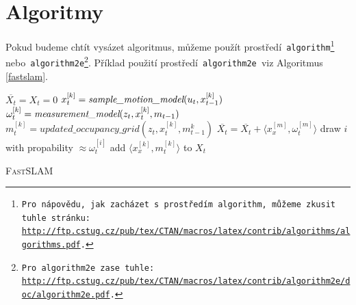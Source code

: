 \documentclass[a4paper, 11pt]{article}
\begin{document}
\section{Algoritmy}\label{algo}
Pokud budeme chtít vysázet algoritmus, můžeme použít prostředí\texttt{ algorithm\footnote{Pro nápovědu, jak zacházet s~prostředím\texttt{ algorithm,} můžeme zkusit tuhle stránku:\\
\href{http://ftp.cstug.cz/pub/tex/CTAN/macros/latex/contrib/algorithms/algorithms.pdf}{http://ftp.cstug.cz/pub/tex/CTAN/macros/latex/contrib/algorithms/algorithms.pdf}.} }nebo\texttt{ algorithm2e\footnote{Pro\texttt{ algorithm2e }zase tuhle: \href{http://ftp.cstug.cz/pub/tex/CTAN/macros/latex/contrib/algorithm2e/doc/algorithm2e.pdf}{http://ftp.cstug.cz/pub/tex/CTAN/macros/latex/contrib/algorithm2e/doc/algorithm2e.pdf}.}}.
Příklad použití prostředí\texttt{ algorithm2e }viz Algoritmus \ref{fastslam}.\\
\IncMargin{1.7em}
\begin{algorithm}[ht]
    \SetAlgoNoLine
    \SetNlSty{}{}{:}
    \DontPrintSemicolon
    \Indm\Indmm
    \BlankLine
    \Indp\Indpp
    $\overline{X_t} = X_t = 0$\;
    {
        \Indpp
        $x_t^{[k]} =  \emph{sample\_motion\_model}(u_t, x_{t-1}^{[k]})$\;
        $\omega_t^{[k]} =  \emph{measurement\_model}(z_t, x_t^{[k]},m_{t-1})$\;
        $m_t^{[k]} = updated\_occupancy\_grid(z_t, x_t^{[k]},m_{t-1}^k)$\;
        $\overline{X_t} = \overline{X_t} + \langle x_x^{[m]}, \omega_t^{[m]} \rangle$\;
        \Indmm
    }
    {
        \Indpp
        draw $i$ with propability $\approx \omega_t^{[i]}$\;
        add $\langle x_x^{[k]}, m_t^{[k]} \rangle$ to $X_t$\;
        \Indmm
    }
    \caption{\textsc{FastSLAM\label{fastslam}}}
\end{algorithm}
\vspace{-0.8em} %
\end{document}
